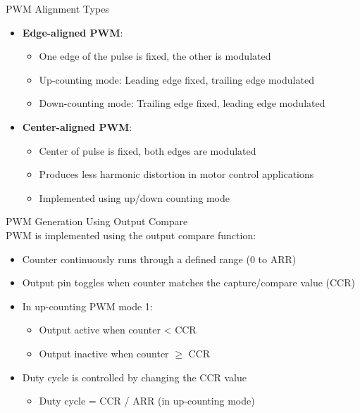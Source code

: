 \begin{definition}{PWM Alignment Types}
\begin{itemize}
    \item \textbf{Edge-aligned PWM}:
    \begin{itemize}
        \item One edge of the pulse is fixed, the other is modulated
        \item Up-counting mode: Leading edge fixed, trailing edge modulated
        \item Down-counting mode: Trailing edge fixed, leading edge modulated
    \end{itemize}
    \item \textbf{Center-aligned PWM}:
    \begin{itemize}
        \item Center of pulse is fixed, both edges are modulated
        \item Produces less harmonic distortion in motor control applications
        \item Implemented using up/down counting mode
    \end{itemize}
\end{itemize}
\end{definition}

\begin{concept}{PWM Generation Using Output Compare}\\
PWM is implemented using the output compare function:
\begin{itemize}
    \item Counter continuously runs through a defined range (0 to ARR)
    \item Output pin toggles when counter matches the capture/compare value (CCR)
    \item In up-counting PWM mode 1:
    \begin{itemize}
        \item Output active when counter < CCR
        \item Output inactive when counter $\geq$ CCR
    \end{itemize}
    \item Duty cycle is controlled by changing the CCR value
    \begin{itemize}
        \item Duty cycle = CCR / ARR (in up-counting mode)
    \end{itemize}
\end{itemize}
\end{concept}

